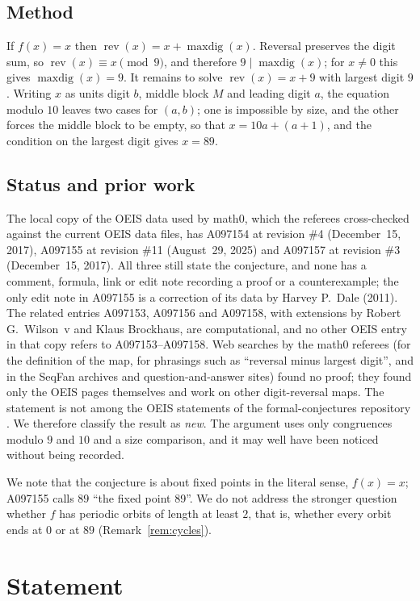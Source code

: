 \documentclass[11pt]{amsart}
\theoremstyle{plain}
\theoremstyle{definition}
\newcommand{\rev}{\operatorname{rev}}
\newcommand{\maxdig}{\operatorname{maxdig}}
\begin{document}
\subsection*{Method}
If $f(x)=x$ then $\rev(x)=x+\maxdig(x)$. Reversal preserves the digit sum, so $\rev(x)\equiv x\pmod 9$, and therefore $9\mid\maxdig(x)$; for $x\ne0$ this gives $\maxdig(x)=9$. It remains to solve $\rev(x)=x+9$ with largest digit $9$. Writing $x$ as units digit $b$, middle block $M$ and leading digit $a$, the equation modulo $10$ leaves two cases for $(a,b)$; one is impossible by size, and the other forces the middle block to be empty, so that $x=10a+(a+1)$, and the condition on the largest digit gives $x=89$.

\subsection*{Status and prior work}
The local copy of the OEIS data used by math0, which the referees cross-checked against the current OEIS data files, has A097154 at revision \#4 (December~15, 2017), A097155 at revision \#11 (August~29, 2025) and A097157 at revision \#3 (December~15, 2017). All three still state the conjecture, and none has a comment, formula, link or edit note recording a proof or a counterexample; the only edit note in A097155 is a correction of its data by Harvey P.~Dale (2011). The related entries A097153, A097156 and A097158, with extensions by Robert G.~Wilson~v and Klaus Brockhaus, are computational, and no other OEIS entry in that copy refers to A097153--A097158.
Web searches by the math0 referees (for the definition of the map, for phrasings such as ``reversal minus largest digit'', and in the SeqFan archives and question-and-answer sites) found no proof; they found only the OEIS pages themselves and work on other digit-reversal maps.
The statement is not among the OEIS statements of the formal-conjectures repository \cite{FC}.
We therefore classify the result as \emph{new}. The argument uses only congruences modulo $9$ and $10$ and a size comparison, and it may well have been noticed without being recorded.

We note that the conjecture is about fixed points in the literal sense, $f(x)=x$; A097155 calls $89$ ``the fixed point 89''. We do not address the stronger question whether $f$ has periodic orbits of length at least $2$, that is, whether every orbit ends at $0$ or at $89$ (Remark~\ref{rem:cycles}).

\section{Statement}\label{sec:statement}
\end{document}
